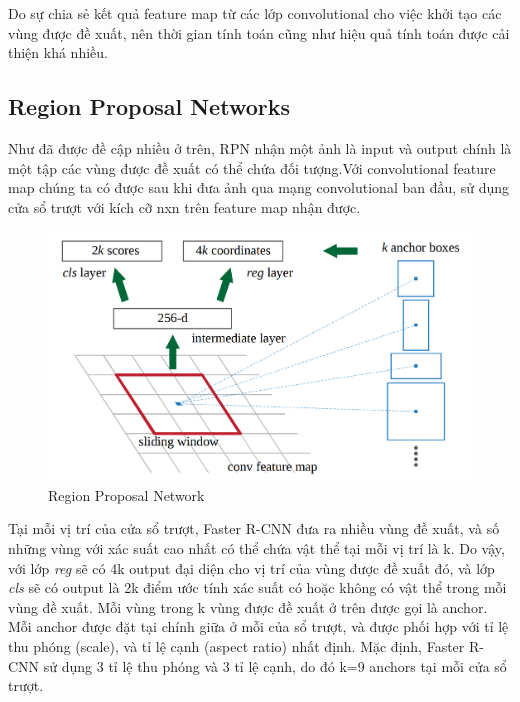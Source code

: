 Do sự chia sẻ kết quả feature map từ các lớp convolutional cho  việc khởi tạo các vùng được đề xuất, nên thời gian tính toán cũng như hiệu quả tính toán được cải thiện khá nhiều.

\subsection{Region Proposal Networks}
Như đã được đề cập nhiều ở trên, RPN nhận một ảnh là input và output chính là một tập các vùng được đề xuất có thể chứa đối tượng.Với convolutional feature map chúng ta có được sau khi đưa ảnh qua mạng convolutional ban đầu, sử dụng cửa sổ trượt với kích cỡ nxn trên feature map nhận được.\\

\begin{center}
   \begin{figure}[H]
   \begin{center}
     \includegraphics[scale=0.25]{image/anchor}
    \end{center}
    \caption{Region Proposal Network}
    \label{RPN}
    \end{figure}
\end{center}
Tại mỗi vị trí của cửa sổ trượt, Faster R-CNN đưa ra nhiều vùng đề xuất, và  số  những vùng với xác suất cao nhất có thể chứa vật thể tại mỗi vị trí là k. Do vậy, với lớp \textit{reg} sẽ có 4k output đại diện cho vị trí của vùng được đề xuất đó, và lớp \textit{cls} sẽ có output là 2k điểm ước tính xác suất có hoặc không có vật thể trong mỗi vùng đề xuất. Mỗi vùng trong k vùng được đề xuất ở trên được gọi là anchor. Mỗi anchor được đặt tại chính giữa ở mỗi của sổ trượt, và được phối hợp với tỉ lệ thu phóng (scale), và tỉ lệ cạnh (aspect ratio) nhất định. Mặc định, Faster R-CNN sử dụng 3 tỉ lệ thu phóng và 3 tỉ lệ cạnh, do đó k=9 anchors tại mỗi cửa sổ trượt.

